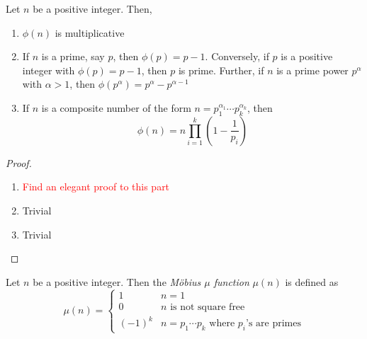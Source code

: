 \begin{theorem}
    Let $n$ be a positive integer. Then,
    \begin{enumerate}
        \item $\phi(n)$ is multiplicative 
        \item If $n$ is a prime, say $p$, then $\phi(p) = p -1$. Conversely, if $p$ is a positive integer with $\phi(p) = p - 1$, then $p$ is prime. Further, if $n$ is a prime power $p^\alpha$ with $\alpha > 1$, then $\phi(p^\alpha) = p^\alpha - p^{\alpha - 1}$ 
        \item If $n$ is a composite number of the form $n = p_1^{\alpha_1}\cdots p_k^{\alpha_k}$, then 
        \begin{equation*}
            \phi(n) = n\prod_{i=1}^k\left(1 - \frac{1}{p_i}\right)
        \end{equation*}
    \end{enumerate}
\end{theorem}
\begin{proof}
    \hfill 
    \begin{enumerate}
        \item \textcolor{red}{Find an elegant proof to this part}
        \item Trivial
        \item Trivial
    \end{enumerate}
\end{proof}

\begin{definition}
    Let $n$ be a positive integer. Then the \textit{M\"obius $\mu$ function} $\mu(n)$ is defined as 
    \begin{equation*}
        \mu(n) = 
        \begin{cases}
            1 & n = 1\\
            0 & \text{$n$ is not square free}\\
            (-1)^k & n = p_1\cdots p_k \text{ where $p_i$'s are primes}
        \end{cases}
    \end{equation*}
\end{definition}

